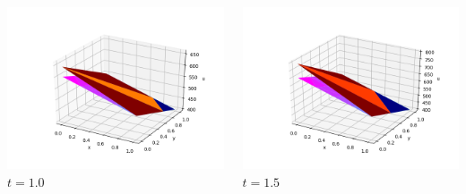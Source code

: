 \documentclass[]{beamer}
\begin{document}
\begin{frame}[t]
\begin{columns}
\begin{center}
			\includegraphics[scale=0.2]{figures/2D_xy_h1m/2D_xy_homog1mat_u_vs_x_10}\\
			$t=1.0$
			\end{center}
			\begin{center}
			\includegraphics[scale=0.2]{figures/2D_xy_h1m/2D_xy_homog1mat_u_vs_x_15}\\
			\tiny$t=1.5$			
			
			\null
			

\end{center}
\end{columns}
\end{frame}
\end{document}
